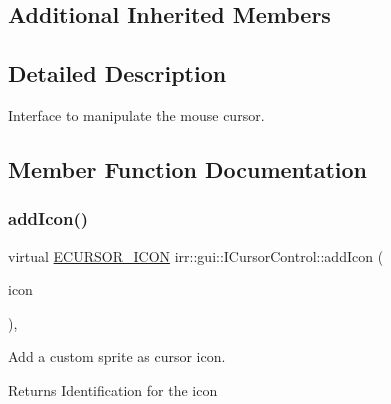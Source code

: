 \subsection*{Additional Inherited Members}


\subsection{Detailed Description}
Interface to manipulate the mouse cursor. 

\subsection{Member Function Documentation}
\mbox{\label{classirr_1_1gui_1_1ICursorControl_a102ff455c70595886281e636ef063d3b}} 
\subsubsection{\texorpdfstring{add\+Icon()}{addIcon()}}
{\footnotesize\ttfamily virtual \hyperlink{namespaceirr_1_1gui_aefee802dd632c5735703e40ef40f879b}{E\+C\+U\+R\+S\+O\+R\+\_\+\+I\+C\+ON} irr\+::gui\+::\+I\+Cursor\+Control\+::add\+Icon (\begin{DoxyParamCaption}\item[{const \hyperlink{structirr_1_1gui_1_1SCursorSprite}{gui\+::\+S\+Cursor\+Sprite} \&}]{icon }\end{DoxyParamCaption})\hspace{0.3cm}{\ttfamily [inline]}, {\ttfamily [virtual]}}



Add a custom sprite as cursor icon. 

\begin{DoxyReturn}{Returns}
Identification for the icon 
\end{DoxyReturn}
\mbox{\label{classirr_1_1gui_1_1ICursorControl_a3e7c8cb1f03e1ccc31fcc3c30f717762}} 
